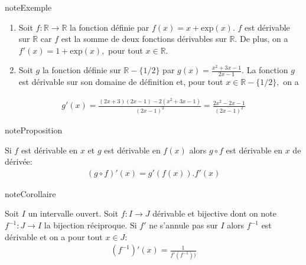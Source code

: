 \documentclass[letterpaper,10pt,french]{jupyterBook}
\begin{document}
\begin{sphinxadmonition}{note}{Exemple}
\begin{enumerate}
%
\item {} 
\sphinxAtStartPar
Soit \(f:\mathbb{R}\rightarrow \mathbb{R}\) la fonction définie par \(f(x)=x+\mbox{exp}(x).\) \(f\) est dérivable sur \(\mathbb{R}\) car \(f\) est la somme de deux fonctions dérivables sur \(\mathbb{R}.\) De plus, on a \(f'(x)=1+\mbox{exp}(x),\) pour tout \(x\in \mathbb{R}.\)

\item {} 
\sphinxAtStartPar
Soit \(g\) la fonction définie sur \(\mathbb{R}-\{1/2\}\) par \(g(x)=\frac{x^2+3x-1}{2x-1}.\) La fonction \(g\) est dérivable sur son domaine de définition et, pour tout \(x\in \mathbb{R}-\{1/2\},\) on a

\end{enumerate}
\begin{equation*}
\begin{split}
g'(x)=\frac{(2x+3)(2x-1)-2(x^2+3x-1)}{(2x-1)^2}=\frac{2x^2-2x-1}{(2x-1)^2}
\end{split}
\end{equation*}\end{sphinxadmonition}

\begin{sphinxadmonition}{note}{Proposition}

\sphinxAtStartPar
Si \(f\) est dérivable en \(x\) et \(g\) est dérivable en \(f(x)\) alors \(g\circ f\) est dérivable en \(x\) de dérivée:
\begin{equation*}
\begin{split}
(g\circ f)'(x)=g'(f(x)).f'(x)
\end{split}
\end{equation*}\end{sphinxadmonition}

\begin{sphinxadmonition}{note}{Corollaire}

\sphinxAtStartPar
Soit \(I\) un intervalle ouvert. Soit \(f:I\rightarrow J\) dérivable et bijective dont on note \(f^{-1}:J\rightarrow I\) la bijection réciproque. Si \(f'\) ne s’annule pas sur \(I\) alors \(f^{-1}\) est dérivable et on a pour tout \(x\in J:\)
\begin{equation*}
\begin{split}
(f^{-1})'(x)=\frac{1}{f'(f^{-1}))}
\end{split}
\end{equation*}\end{sphinxadmonition}
\end{document}
